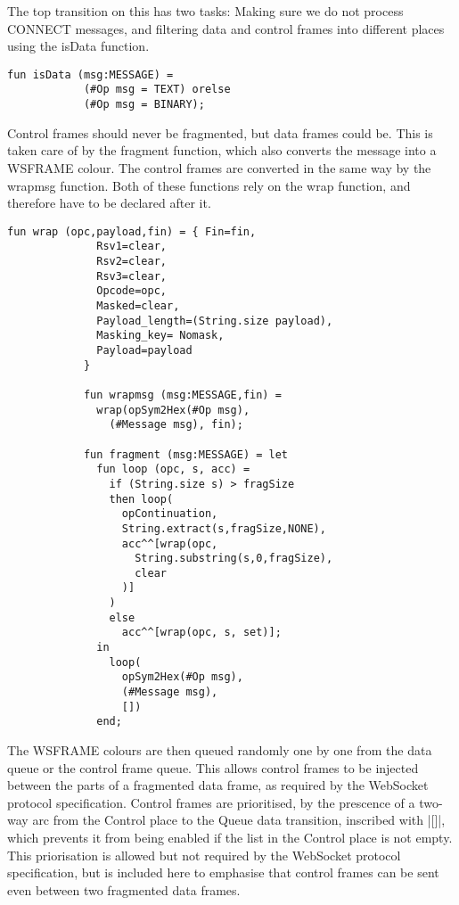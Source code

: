 			The top transition on this has two tasks: Making sure we do not process
			CONNECT messages, and filtering data and control frames into different
			places using the isData function. 
			
			\begin{lstlisting}[label=lst:isData,caption=isData,gobble=3]
			fun isData (msg:MESSAGE) =
			(#Op msg = TEXT) orelse
			(#Op msg = BINARY);
			\end{lstlisting}
			
			Control frames should never be fragmented, but data frames could be. This is
			taken care of by the fragment function, which also converts the message into
			a WSFRAME colour. The control frames are converted in the same way by the
			wrapmsg function. Both of these functions rely on the wrap function, and
			therefore have to be declared after it.
			
			
			\begin{lstlisting}[label=lst:fragment,caption=wrap wrapmsg and
			fragment,gobble=3]
			fun wrap (opc,payload,fin) = { Fin=fin,
			  Rsv1=clear,
			  Rsv2=clear,
			  Rsv3=clear,
			  Opcode=opc,
			  Masked=clear,
			  Payload_length=(String.size payload),
			  Masking_key= Nomask,
			  Payload=payload
			}
			
			fun wrapmsg (msg:MESSAGE,fin) = 
			  wrap(opSym2Hex(#Op msg), 
			    (#Message msg), fin);
			    
			fun fragment (msg:MESSAGE) = let
			  fun loop (opc, s, acc) = 
			    if (String.size s) > fragSize
			    then loop(
			      opContinuation,
			      String.extract(s,fragSize,NONE),
			      acc^^[wrap(opc, 
			        String.substring(s,0,fragSize), 
			        clear
			      )]
			    )
			    else 
			      acc^^[wrap(opc, s, set)];
			  in 
			    loop(
			      opSym2Hex(#Op msg), 
			      (#Message msg), 
			      [])
			  end;
			\end{lstlisting}
			
			The WSFRAME colours are then queued randomly one by one from the data queue or
			the control frame queue. This allows control frames to be injected between
			the parts of a fragmented data frame, as required by the WebSocket protocol
			specification. Control frames are prioritised, by the prescence of a
			two-way arc from the Control place to the Queue data transition, inscribed
			with |[]|, which prevents it from being enabled if the list
			in the Control place is not empty. This priorisation is allowed but not
			required by the WebSocket protocol specification, but is included here to
			emphasise that control frames can be sent even between two fragmented data
			frames.
		
